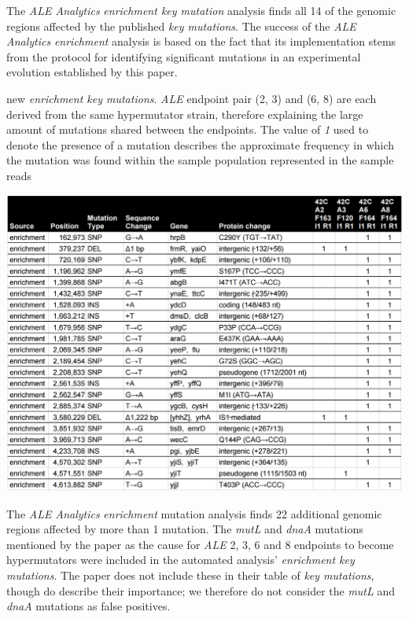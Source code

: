 \documentclass[12pt,final,masters,chapterheads]{ucsd}  %
\begin{document}
The \textit{ALE Analytics} \textit{enrichment key mutation} analysis finds all 14 of the genomic regions affected by the published \textit{key mutations}. The success of the \textit{ALE Analytics} \textit{enrichment} analysis is based on the fact that its implementation stems from the protocol for identifying significant mutations in an experimental evolution established by this paper.
\begin{table}[H]
  \caption{new \textit{enrichment key mutations}. \textit{ALE} endpoint pair (2, 3) and (6, 8) are each derived from the same hypermutator strain, therefore explaining the large amount of mutations shared between the endpoints. The value of \textit{1} used to denote the presence of a mutation describes the approximate frequency in which the mutation was found within the sample population represented in the sample reads \cite{breseq_paper}}
  \centering
  \includegraphics[width=\textwidth]{42c_new_enrich_muts.png}
\end{table}
The\textit{ ALE Analytics} \textit{enrichment} mutation analysis finds 22 additional genomic regions affected by more than 1 mutation. The \textit{mutL} and \textit{dnaA} mutations mentioned by the paper as the cause for \textit{ALE} 2, 3, 6 and 8 endpoints to become hypermutators were included in the automated analysis' \textit{enrichment key mutations}. The paper does not include these in their table of \textit{key mutations}, though do describe their importance; we therefore do not consider the \textit{mutL} and \textit{dnaA} mutations as false positives.
\end{document}
